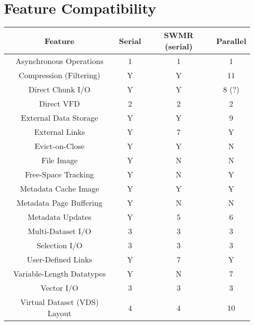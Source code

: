 \newpage

\section{Feature Compatibility}

\begin{minipage}{\textwidth}
    \begin{center}
        \begin{tabular}{|| c | c | c | c ||}
            \hline
            \textbf{Feature} & \textbf{Serial} & \textbf{SWMR (serial)} & \textbf{Parallel} \\
            \hline
            Asynchronous Operations & 1 & 1 & 1 \\
            \hline
            Compression (Filtering) & Y & Y & 11 \\
            \hline
            Direct Chunk I/O & Y & Y & 8 (?) \\
            \hline
            Direct VFD & 2 & 2 & 2 \\
            \hline
            External Data Storage & Y & Y & 9 \\
            \hline
            External Links & Y & 7 & Y \\
            \hline
            Evict-on-Close & Y & Y & N \\
            \hline
            File Image & Y & N & N \\
            \hline
            Free-Space Tracking & Y & N & Y \\
            \hline
            Metadata Cache Image & Y & Y & Y \\
            \hline
            Metadata Page Buffering & Y & N & N \\
            \hline
            Metadata Updates & Y & 5 & 6 \\
            \hline
            Multi-Dataset I/O & 3 & 3 & 3 \\
            \hline
            Selection I/O & 3 & 3 & 3 \\
            \hline
            User-Defined Links & Y & 7 & Y \\
            \hline
            Variable-Length Datatypes & Y & N & 7 \\
            \hline
            Vector I/O & 3 & 3 & 3 \\
            \hline
            Virtual Dataset (VDS) Layout & 4 & 4 & 10 \\
            \hline
        \end{tabular}


\end{center}
\end{minipage}
